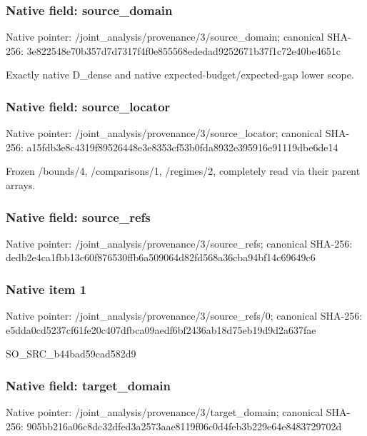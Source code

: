 \documentclass[10pt,a4paper]{article}
\begin{document}
\subsubsection{Native field: source\_\allowbreak{}domain}
Native pointer: /joint\_\allowbreak{}analysis/provenance/3/source\_\allowbreak{}domain; canonical SHA-256: 3e822548e70b357d7d7317f4f0e855568ededad9252671b37f1c72e40be4651c

\begingroup\raggedright\sloppy Exactly native D\_\allowbreak{}dense and native expected-budget/\allowbreak{}expected-gap lower scope.\par\endgroup

\subsubsection{Native field: source\_\allowbreak{}locator}
Native pointer: /joint\_\allowbreak{}analysis/provenance/3/source\_\allowbreak{}locator; canonical SHA-256: a15fdb3e8c4319f89526448e3e8353cf53b0fda8932e395916e91119dbe6de14

\begingroup\raggedright\sloppy Frozen /\allowbreak{}bounds/\allowbreak{}4,\allowbreak{} /\allowbreak{}comparisons/\allowbreak{}1,\allowbreak{} /\allowbreak{}regimes/\allowbreak{}2,\allowbreak{} completely read via their parent arrays.\par\endgroup

\subsubsection{Native field: source\_\allowbreak{}refs}
Native pointer: /joint\_\allowbreak{}analysis/provenance/3/source\_\allowbreak{}refs; canonical SHA-256: dedb2e4ca1fbb13c60f876530ffb6a509064d82fd568a36cba94bf14c69649c6

\subsubsection{Native item 1}
Native pointer: /joint\_\allowbreak{}analysis/provenance/3/source\_\allowbreak{}refs/0; canonical SHA-256: e5dda0cd5237cf61fe20c407dfbca09aedf6bf2436ab18d75eb19d9d2a637fae

\begingroup\raggedright\sloppy SO\_\allowbreak{}SRC\_\allowbreak{}b44bad59cad582d9\par\endgroup

\subsubsection{Native field: target\_\allowbreak{}domain}
Native pointer: /joint\_\allowbreak{}analysis/provenance/3/target\_\allowbreak{}domain; canonical SHA-256: 905bb216a06c8dc32dfed3a2573aae8119f06c0d4feb3b229e64e8483729702d
\end{document}

